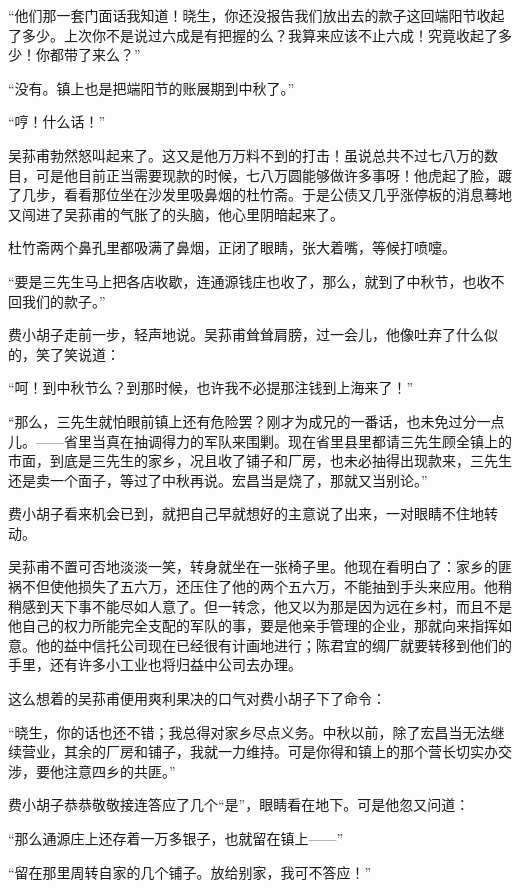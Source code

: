 \par “他们那一套门面话我知道！晓生，你还没报告我们放出去的款子这回端阳节收起了多少。上次你不是说过六成是有把握的么？我算来应该不止六成！究竟收起了多少！你都带了来么？”
\par “没有。镇上也是把端阳节的账展期到中秋了。”
\par “哼！什么话！”
\par 吴荪甫勃然怒叫起来了。这又是他万万料不到的打击！虽说总共不过七八万的数目，可是他目前正当需要现款的时候，七八万圆能够做许多事呀！他虎起了脸，踱了几步，看看那位坐在沙发里吸鼻烟的杜竹斋。于是公债又几乎涨停板的消息蓦地又闯进了吴荪甫的气胀了的头脑，他心里阴暗起来了。
\par 杜竹斋两个鼻孔里都吸满了鼻烟，正闭了眼睛，张大着嘴，等候打喷嚏。
\par “要是三先生马上把各店收歇，连通源钱庄也收了，那么，就到了中秋节，也收不回我们的款子。”
\par 费小胡子走前一步，轻声地说。吴荪甫耸耸肩膀，过一会儿，他像吐弃了什么似的，笑了笑说道：
\par “呵！到中秋节么？到那时候，也许我不必提那注钱到上海来了！”
\par “那么，三先生就怕眼前镇上还有危险罢？刚才为成兄的一番话，也未免过分一点儿。——省里当真在抽调得力的军队来围剿。现在省里县里都请三先生顾全镇上的市面，到底是三先生的家乡，况且收了铺子和厂房，也未必抽得出现款来，三先生还是卖一个面子，等过了中秋再说。宏昌当是烧了，那就又当别论。”
\par 费小胡子看来机会已到，就把自己早就想好的主意说了出来，一对眼睛不住地转动。
\par 吴荪甫不置可否地淡淡一笑，转身就坐在一张椅子里。他现在看明白了：家乡的匪祸不但使他损失了五六万，还压住了他的两个五六万，不能抽到手头来应用。他稍稍感到天下事不能尽如人意了。但一转念，他又以为那是因为远在乡村，而且不是他自己的权力所能完全支配的军队的事，要是他亲手管理的企业，那就向来指挥如意。他的益中信托公司现在已经很有计画地进行；陈君宜的绸厂就要转移到他们的手里，还有许多小工业也将归益中公司去办理。
\par 这么想着的吴荪甫便用爽利果决的口气对费小胡子下了命令：
\par “晓生，你的话也还不错；我总得对家乡尽点义务。中秋以前，除了宏昌当无法继续营业，其余的厂房和铺子，我就一力维持。可是你得和镇上的那个营长切实办交涉，要他注意四乡的共匪。”
\par 费小胡子恭恭敬敬接连答应了几个“是”，眼睛看在地下。可是他忽又问道：
\par “那么通源庄上还存着一万多银子，也就留在镇上——”
\par “留在那里周转自家的几个铺子。放给别家，我可不答应！”
